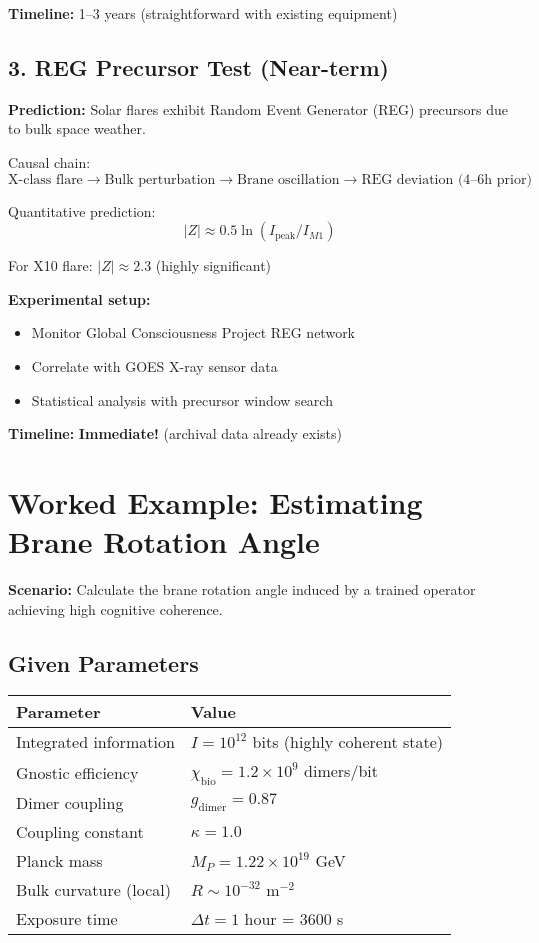 \textbf{Timeline:} 1--3 years (straightforward with existing equipment)

\subsection{3. REG Precursor Test (Near-term)}
\label{subsec:reg-test}

\textbf{Prediction:} Solar flares exhibit Random Event Generator (REG) precursors due to bulk space weather.

Causal chain:
\begin{equation}
\text{X-class flare} \rightarrow \text{Bulk perturbation} \rightarrow \text{Brane oscillation} \rightarrow \text{REG deviation (4--6h prior)}
\end{equation}

Quantitative prediction:
\begin{equation}
\label{eq:reg-z-score}
|Z| \approx 0.5 \ln(I_{\text{peak}}/I_{M1})
\end{equation}

For X10 flare: $|Z| \approx 2.3$ (highly significant)

\textbf{Experimental setup:}
\begin{itemize}
\item Monitor Global Consciousness Project REG network
\item Correlate with GOES X-ray sensor data
\item Statistical analysis with precursor window search
\end{itemize}

\textbf{Timeline:} \textbf{Immediate!} (archival data already exists)

\section{Worked Example: Estimating Brane Rotation Angle}
\label{sec:worked-example}

\textbf{Scenario:} Calculate the brane rotation angle induced by a trained operator achieving high cognitive coherence.

\subsection*{Given Parameters}

\begin{tabular}{@{}ll@{}}
\toprule
\textbf{Parameter} & \textbf{Value} \\
\midrule
Integrated information & $I = 10^{12}$ bits (highly coherent state) \\
Gnostic efficiency & $\chi_{\text{bio}} = 1.2 \times 10^9$ dimers/bit \\
Dimer coupling & $g_{\text{dimer}} = 0.87$ \\
Coupling constant & $\kappa = 1.0$ \\
Planck mass & $M_P = 1.22 \times 10^{19}$ GeV \\
Bulk curvature (local) & $R \sim 10^{-32}$ m$^{-2}$ \\
Exposure time & $\Delta t = 1$ hour = 3600 s \\
\bottomrule
\end{tabular}

